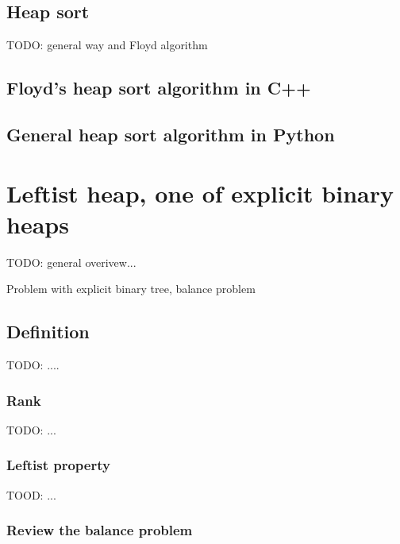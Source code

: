 \documentclass{article}
\begin{document}
\subsection{Heap sort}

TODO: general way and Floyd algorithm

\subsection*{Floyd's heap sort algorithm in C++}

\subsection*{General heap sort algorithm in Python}

\section{Leftist heap, one of explicit binary heaps}
\label{ebheap}

TODO: general overivew...

Problem with explicit binary tree, balance problem

\subsection{Definition}

TODO: ....

\subsubsection{Rank}

TODO: ...

\subsubsection{Leftist property}

TOOD: ...

\subsubsection{Review the balance problem}
\end{document}
